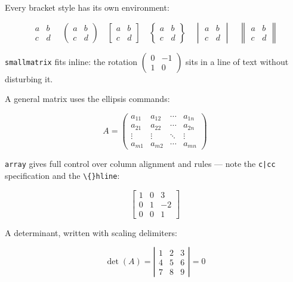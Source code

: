 Every bracket style has its own environment:

\[
\begin{matrix} a & b \\ c & d \end{matrix} \quad
\begin{pmatrix} a & b \\ c & d \end{pmatrix} \quad
\begin{bmatrix} a & b \\ c & d \end{bmatrix} \quad
\begin{Bmatrix} a & b \\ c & d \end{Bmatrix} \quad
\begin{vmatrix} a & b \\ c & d \end{vmatrix} \quad
\begin{Vmatrix} a & b \\ c & d \end{Vmatrix}
\]

\texttt{smallmatrix} fits inline: the rotation $\left(\begin{smallmatrix} 0 & -1 \\ 1 & 0 \end{smallmatrix}\right)$ sits in a line of text without disturbing it.

A general matrix uses the ellipsis commands:

\[
A = \begin{pmatrix}
a_{11} & a_{12} & \cdots & a_{1n} \\
a_{21} & a_{22} & \cdots & a_{2n} \\
\vdots & \vdots & \ddots & \vdots \\
a_{m1} & a_{m2} & \cdots & a_{mn}
\end{pmatrix}
\]

\texttt{array} gives full control over column alignment and rules — note the \texttt{c|cc} specification and the \texttt{\textbackslash\{\}hline}:

\[
\left[\begin{array}{cc|c}
1 & 0 & 3 \\
0 & 1 & -2 \\
\hline
0 & 0 & 1
\end{array}\right]
\]

A determinant, written with scaling delimiters:

\[
\det(A) = \left| \begin{array}{ccc}
1 & 2 & 3 \\
4 & 5 & 6 \\
7 & 8 & 9
\end{array} \right| = 0
\]

